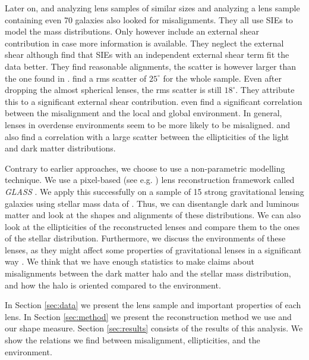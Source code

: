 \documentclass[useAMS,usenatbib]{mn2e}
\begin{document}
Later on, \cite{2006ApJ...649..599K} and \cite{2012ApJ...761..170G} analyzing lens samples of similar sizes and \cite{2009ApJ...690..670T} analyzing a lens sample containing even 70 galaxies also looked for misalignments. They all use SIEs to model the mass distributions. Only \cite{2012ApJ...761..170G} however include an external shear contribution in case more information is available. They neglect the external shear although \cite{1998ApJ...509..561K} find that SIEs with an independent external shear term fit the data better. They find reasonable alignments, the scatter is however larger than the one found in \cite{1997ApJ...482..604K}. \cite{2012ApJ...761..170G} find a rms scatter of $25^{\circ}$ for the whole sample. Even after dropping the almost spherical lenses, the rms scatter is still $18^{\circ}$. They attribute this to a significant external shear contribution. \cite{2009ApJ...690..670T} even find a significant correlation between the misalignment and the local and global environment. In general, lenses in overdense environments seem to be more likely to be misaligned. \cite{2009ApJ...690..670T} and \cite{2012ApJ...761..170G} also find a correlation with a large scatter between the ellipticities of the light and dark matter distributions.

Contrary to earlier approaches, we choose to use a non-parametric modelling technique. We use a pixel-based (see e.g. \cite{1997MNRAS.292..148S}) lens reconstruction framework called \textit{GLASS} \citep{2012MNRAS.425.3077L}. We apply this successfully on a sample of 15 strong gravitational lensing galaxies using stellar mass data of \cite{leier11phd}. Thus, we can disentangle dark and luminous matter and look at the shapes and alignments of these distributions. We can also look at the ellipticities of the reconstructed lenses and compare them to the ones of the stellar distribution. Furthermore, we discuss the environments of these lenses, as they might affect some properties of gravitational lenses in a significant way \citep{2006ApJ...641..169M,2011ApJ...726...84W}. We think that we have enough statistics to make claims about misalignments between the dark matter halo and the stellar mass distribution, and how the halo is oriented compared to the environment.

In Section \ref{sec:data} we present the lens sample and important properties of each lens. In Section \ref{sec:method} we present the reconstruction method we use and our shape measure. Section \ref{sec:results} consists of the results of this analysis. We show the relations we find between misalignment, ellipticities, and the environment.
\end{document}
